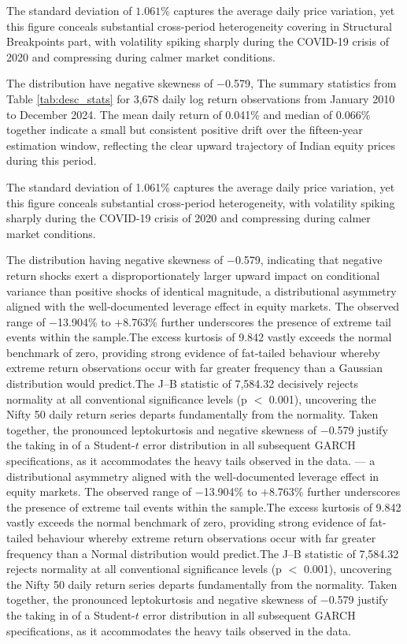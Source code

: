 The standard deviation of $1.061\%$ captures the average 
daily price variation, yet this figure conceals 
substantial cross-period heterogeneity covering in  Structural Breakpoints part, with volatility spiking sharply during the COVID-19 crisis of 2020 and 
compressing during calmer market conditions.

The distribution have negative skewness 
of $-$0.579, The summary statistics from Table \ref{tab:desc_stats} for 3,678 daily 
log return observations from January 2010 to December 
2024. The mean daily return of 0.041\% and median of 
0.066\% together indicate a small but consistent positive 
drift over the fifteen-year estimation window, reflecting 
the clear upward trajectory of Indian equity prices during 
this period.

The standard deviation of 1.061\% captures the average 
daily price variation, yet this figure conceals 
substantial cross-period heterogeneity, with volatility 
spiking sharply during the COVID-19 crisis of 2020 and 
compressing during calmer market conditions.

The distribution having negative skewness 
of $-$0.579, indicating that 
negative return shocks exert a disproportionately 
larger upward impact on conditional variance than 
positive shocks of identical magnitude, a distributional asymmetry aligned with the well-documented leverage effect in equity markets. 
The observed range of $-$13.904\% to $+$8.763\% further 
underscores the presence of extreme tail events within 
the sample.The excess kurtosis of 9.842 vastly exceeds the 
normal benchmark of zero, providing strong evidence of 
fat-tailed behaviour whereby extreme return observations 
occur with far greater frequency than a Gaussian 
distribution would predict.The J--B statistic of 7,584.32 decisively rejects 
normality at all conventional significance levels 
(p $<$ 0.001), uncovering the Nifty 50 daily 
return series departs fundamentally from the normality. 
Taken together, the pronounced leptokurtosis and 
negative skewness of $-$0.579 justify the taking in of 
a Student-$t$ error distribution in all subsequent 
GARCH specifications, as it accommodates the heavy 
tails observed in the data. --- a distributional asymmetry aligned with 
the well-documented leverage effect in equity markets. 
The observed range of $-$13.904\% to $+$8.763\% further 
underscores the presence of extreme tail events within 
the sample.The excess kurtosis of 9.842 vastly exceeds the 
normal benchmark of zero, providing strong evidence of 
fat-tailed behaviour whereby extreme return observations 
occur with far greater frequency than a Normal 
distribution would predict.The J--B statistic of 7,584.32 rejects 
normality at all conventional significance levels 
(p $<$ 0.001), uncovering the Nifty 50 daily 
return series departs fundamentally from the normality. 
Taken together, the pronounced leptokurtosis and 
negative skewness of $-$0.579 justify the taking in of 
a Student-$t$ error distribution in all subsequent 
GARCH specifications, as it accommodates the heavy 
tails observed in the data.


